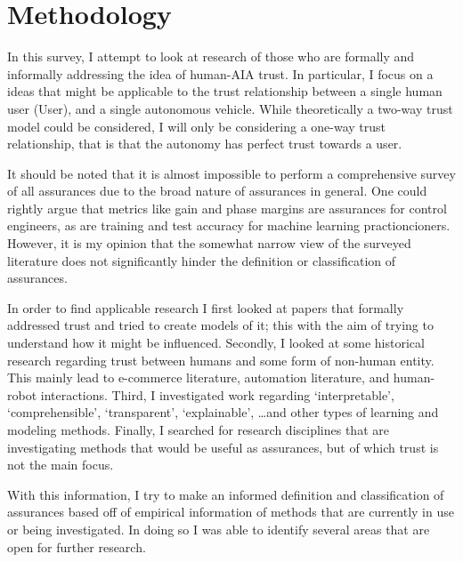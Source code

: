 \section{Methodology} \label{sec:methodology}
    In this survey, I attempt to look at research of those who are formally and informally addressing the idea of human-AIA trust. In particular, I focus on a ideas that might be applicable to the trust relationship between a single human user (User), and a single autonomous vehicle. While theoretically a two-way trust model could be considered, I will only be considering a one-way trust relationship, that is that the autonomy has perfect trust towards a user.

    It should be noted that it is almost impossible to perform a comprehensive survey of all assurances due to the broad nature of assurances in general. One could rightly argue that metrics like gain and phase margins are assurances for control engineers, as are training and test accuracy for machine learning practioncioners. However, it is my opinion that the somewhat narrow view of the surveyed literature does not significantly hinder the definition or classification of assurances.

    In order to find applicable research I first looked at papers that formally addressed trust and tried to create models of it; this with the aim of trying to understand how it might be influenced. Secondly, I looked at some historical research regarding trust between humans and some form of non-human entity. This mainly lead to e-commerce literature, automation literature, and human-robot interactions. Third, I investigated work regarding `interpretable', `comprehensible', `transparent', `explainable', \ldots and other types of learning and modeling methods. Finally, I searched for research disciplines that are investigating methods that would be useful as assurances, but of which trust is not the main focus.

    With this information, I try to make an informed definition and classification of assurances based off of empirical information of methods that are currently in use or being investigated. In doing so I was able to identify several areas that are open for further research. 
